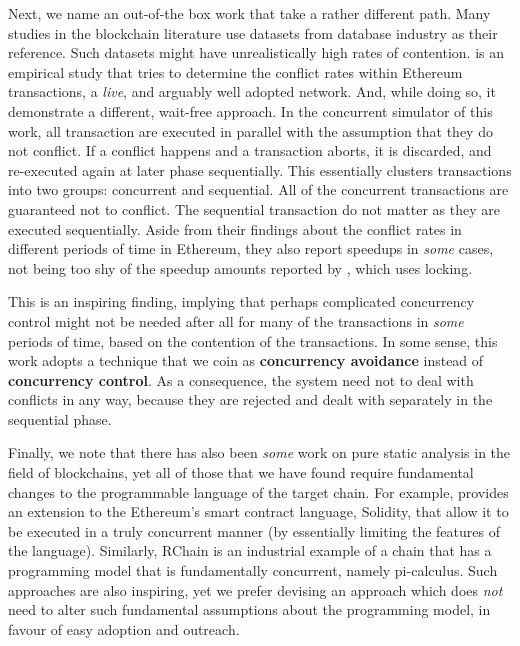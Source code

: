 Next, we name an out-of-the box work that take a rather different path. Many studies in the
blockchain literature use datasets from database industry as their reference. Such datasets might
have unrealistically high rates of contention. \cite{saraphYOLOEmpiricalStudy2019} is an empirical
study that tries to determine the conflict rates within Ethereum transactions, a \textit{live}, and
arguably well adopted network. And, while doing so, it demonstrate a different, wait-free approach.
In the concurrent simulator of this work, all transaction are executed in parallel with the
assumption that they do not conflict. If a conflict happens and a transaction aborts, it is
discarded, and re-executed again at later phase sequentially. This essentially clusters transactions
into two groups: concurrent and sequential. All of the concurrent transactions are guaranteed not to
conflict. The sequential transaction do not matter as they are executed sequentially. Aside from
their findings about the conflict rates in different periods of time in Ethereum, they also report
speedups in \textit{some} cases, not being too shy of the speedup amounts reported by
\cite{dickersonSmartLocksAddingConcurrency2017}, which uses locking.

This is an inspiring finding, implying that perhaps complicated concurrency control might not be
needed after all for many of the transactions in \textit{some} periods of time, based on the
contention of the transactions. In some sense, this work adopts a technique that we coin as
\textbf{concurrency avoidance} instead of \textbf{concurrency control}. As a consequence, the system
need not to deal with conflicts in any way, because they are rejected and dealt with separately in
the sequential phase.

Finally, we note that there has also been \textit{some} work on pure static analysis in the field of
blockchains, yet all of those that we have found require fundamental changes to the programmable
language of the target chain. For example, \cite{bartolettiStaticTrueConcurrent2019} provides an
extension to the Ethereum's smart contract language, Solidity, that allow it to be executed in a
truly concurrent manner (by essentially limiting the features of the language). Similarly, RChain is
an industrial example of a chain that has a programming model that is fundamentally
concurrent\cite{darrylRCast21Currency2019}, namely
pi-calculus\cite{turnerPolymorphicPiCalculusTheory1996}. Such approaches are also inspiring, yet we
prefer devising an approach which does \textit{not} need to alter such fundamental assumptions about
the programming model, in favour of easy adoption and outreach.

